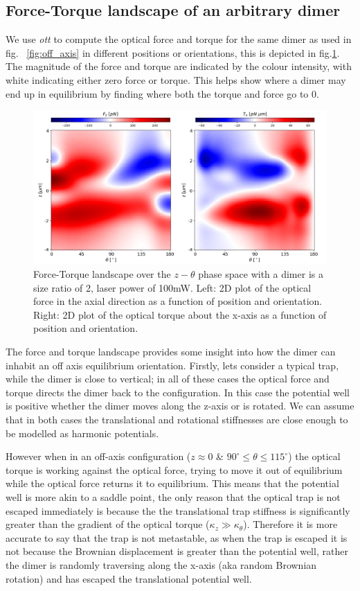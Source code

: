 \subsection{Force-Torque landscape of an arbitrary dimer}
We use \textit{ott} to compute the optical force 
and torque for the same dimer as used in fig.~
\ref{fig:off_axis} in different positions or 
orientations, this is depicted in fig.\ref{fig:force_torque}. 
The magnitude of the force and torque are indicated
by the colour intensity, with white indicating either
zero force or torque. This helps show where a
dimer may end up in equilibrium by finding 
where both the torque and force go to 0.
\begin{figure}[h!]
	\centering
	\includegraphics[width=\linewidth]{force_torque.png}
	\caption{Force-Torque landscape over the $z-\theta$ 
		phase space with a dimer is a size ratio of 2, 
		laser power of 100mW. Left: 2D plot of the 
		optical force in the axial direction as a 
		function of position and orientation. Right: 
		2D plot of the optical torque about the x-axis 
		as a function of position and orientation.}
	\label{fig:force_torque}
\end{figure}

The force and torque landscape provides some insight 
into how the dimer can inhabit an off axis equilibrium
orientation. Firstly, lets consider a typical trap, 
while the dimer is close to vertical; in all of these 
cases the optical force and torque directs the dimer 
back to the configuration. In this case the potential 
well is positive whether the dimer moves along the 
z-axis or is rotated. We can assume that in both cases
the translational and rotational stiffnesses are close
enough to be modelled as harmonic potentials.

However when in an off-axis configuration ($z\approx0$ 
\& $90^\circ\le\theta\le115^\circ$) the optical torque 
is working against the optical force, trying to move it 
out of equilibrium while the optical force returns it to 
equilibrium. This means that the potential well is more 
akin to a saddle point, the only reason that the optical
trap is not escaped immediately is because the the 
translational trap stiffness is significantly greater than
the gradient of the optical torque ($\kappa_z\gg\kappa_
\theta$). Therefore it is more accurate to say that the 
trap is not metastable, as when the trap is escaped it 
is not because the Brownian displacement is greater than
the potential well, rather the dimer is randomly 
traversing along the x-axis (aka random Brownian 
rotation) and has escaped the translational potential 
well. 

